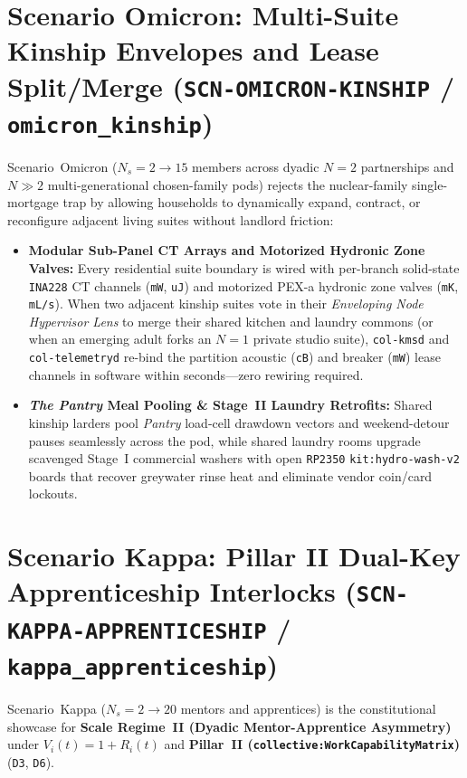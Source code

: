 \section{Scenario Omicron: Multi-Suite Kinship Envelopes and Lease Split/Merge (\texttt{SCN-OMICRON-KINSHIP} / \texttt{omicron\_kinship})}
\label{sec:l2-wave-c-omicron}

Scenario~Omicron ($N_s = 2 \to 15$ members across dyadic $N=2$ partnerships and $N \gg 2$ multi-generational chosen-family pods) rejects the nuclear-family single-mortgage trap by allowing households to dynamically expand, contract, or reconfigure adjacent living suites without landlord friction:
\begin{itemize}
    \item \textbf{Modular Sub-Panel CT Arrays and Motorized Hydronic Zone Valves:} Every residential suite boundary is wired with per-branch solid-state \texttt{INA228} CT channels (\texttt{mW}, \texttt{uJ}) and motorized PEX-a hydronic zone valves (\texttt{mK}, \texttt{mL/s}). When two adjacent kinship suites vote in their \textit{Enveloping Node Hypervisor Lens} to merge their shared kitchen and laundry commons (or when an emerging adult forks an $N=1$ private studio suite), \texttt{col-kmsd} and \texttt{col-telemetryd} re-bind the partition acoustic (\texttt{cB}) and breaker (\texttt{mW}) lease channels in software within seconds---zero rewiring required.
    \item \textbf{\textit{The Pantry} Meal Pooling \& Stage~II Laundry Retrofits:} Shared kinship larders pool \textit{Pantry} load-cell drawdown vectors and weekend-detour pauses seamlessly across the pod, while shared laundry rooms upgrade scavenged Stage~I commercial washers with open \texttt{RP2350} \texttt{kit:hydro-wash-v2} boards that recover greywater rinse heat and eliminate vendor coin/card lockouts.
\end{itemize}

\section{Scenario Kappa: Pillar II Dual-Key Apprenticeship Interlocks (\texttt{SCN-KAPPA-APPRENTICESHIP} / \texttt{kappa\_apprenticeship})}
\label{sec:l2-wave-c-kappa}

Scenario~Kappa ($N_s = 2 \to 20$ mentors and apprentices) is the constitutional showcase for \textbf{Scale Regime~II (Dyadic Mentor-Apprentice Asymmetry)} under $V_i(t) = 1 + R_i(t)$ and \textbf{Pillar~II (\texttt{collective:WorkCapabilityMatrix})} (\texttt{D3}, \texttt{D6}).

